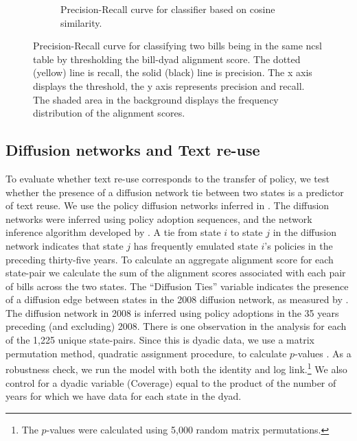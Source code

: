 \documentclass[12pt]{article} %
\begin{document}
\begin{figure}[ht!]
\begin{subfigure}[t]{0.5\textwidth}
        \caption{Precision-Recall curve for classifier based on cosine similarity.}
    \end{subfigure}
    \caption{Precision-Recall curve for classifying two bills being in the same
    ncsl table by thresholding the bill-dyad alignment score. The dotted (yellow) line is recall, the solid (black) line is precision. The x axis
displays the threshold, the y axis represents precision and recall. The shaded
area in the background displays the frequency distribution of the alignment
scores.}
\label{fig:ncsl_prec_rec}
\end{figure}

\subsection{Diffusion networks and Text re-use}

To evaluate whether text re-use corresponds to the transfer of policy, we test whether the presence of a diffusion network tie between two states is a predictor of text reuse. We use the policy diffusion networks inferred in \citet{desmarais2015}. The diffusion networks were inferred using policy adoption sequences, and the network inference algorithm developed by \citet{gomez2010inferring}. A tie from state $i$ to state $j$ in the diffusion network indicates that state $j$ has frequently emulated state $i$'s policies in the preceding thirty-five years. To calculate an aggregate alignment score for each state-pair we calculate the sum of the alignment scores associated with each pair of bills across the two states. The ``Diffusion Ties'' variable indicates the presence of a diffusion edge between states in the 2008 diffusion network, as measured by \citet{desmarais2015}. The diffusion network in 2008 is inferred using policy adoptions in the 35 years preceding (and excluding) 2008.  There is one observation in the analysis for each of the 1,225 unique state-pairs. Since this is dyadic data, we use a matrix permutation method, quadratic assignment procedure, to calculate $p$-values \citep{krackhardt1988}. As a robustness check, we run the model with both the identity and log link.\footnote{The $p$-values were calculated using 5,000 random matrix permutations.} We also control for a dyadic variable (Coverage) equal to the product of the number of years for which we have data for each state in the dyad.
\end{document}

